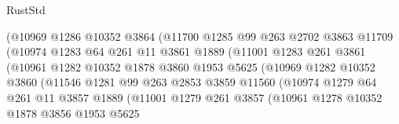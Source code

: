 \begin{lexlean}{RustStd}
\begin{coremodule}
                            (@10969
                              @1286
                              @10352
                              @3864
                              (@11700
                                @1285
                                @99
                                @263
                                @2702
                                @3863
                                @11709
                                (@10974
                                  @1283
                                  @64
                                  @261
                                  @11
                                  @3861
                                  @1889
                                  (@11001
                                    @1283
                                    @261
                                    @3861
                                    (@10961
                                      @1282
                                      @10352
                                      @1878
                                      @3860
                                      @1953
                                      @5625
                                      (@10969
                                        @1282
                                        @10352
                                        @3860
                                        (@11546
                                          @1281
                                          @99
                                          @263
                                          @2853
                                          @3859
                                          @11560
                                          (@10974
                                            @1279
                                            @64
                                            @261
                                            @11
                                            @3857
                                            @1889
                                            (@11001
                                              @1279
                                              @261
                                              @3857
                                              (@10961
                                                @1278
                                                @10352
                                                @1878
                                                @3856
                                                @1953
                                                @5625

\end{coremodule}
\end{lexlean}
